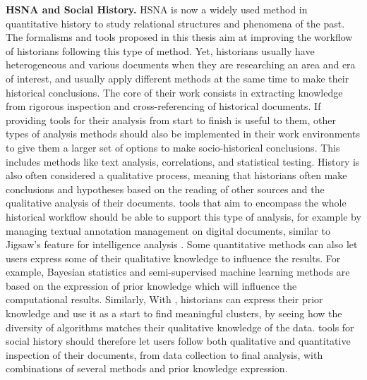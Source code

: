 \noindent\textbf{HSNA and Social History.} HSNA is now a widely used method in quantitative history to study relational structures and phenomena of the past\cite{kerschbaumerPowerNetworksProspects2015, petzCombiningNetworkResearch2022, wetherellHistoricalSocialNetwork1998}. The formalisms and tools proposed in this thesis aim at improving the workflow of historians following this type of method.
Yet, historians usually have heterogeneous and various documents when they are researching an area and era of interest, and usually apply different methods at the same time to make their historical conclusions\cite{padgettRobustActionRise1993, petzCombiningNetworkResearch2022}.
The core of their work consists in extracting knowledge from rigorous inspection and cross-referencing of historical documents.
If providing \va tools for their \hsna analysis from start to finish is useful to them, other types of analysis methods should also be implemented in their work environments to give them a larger set of options to make socio-historical conclusions.
This includes methods like text analysis, correlations, and statistical testing\cite{lemercierQuantitativeMethodsHumanities2019}.
History is also often considered a qualitative process, meaning that historians often make conclusions and hypotheses based on the reading of other sources and the qualitative analysis of their documents.
\va tools that aim to encompass the whole historical workflow should be able to support this type of analysis, for example by managing textual annotation management on digital documents, similar to Jigsaw's feature for intelligence analysis \cite{staskoJigsawSupportingInvestigative2008}.
Some quantitative methods can also let users express some of their qualitative knowledge to influence the results.
For example, Bayesian statistics and semi-supervised machine learning methods are based on the expression of prior knowledge which will influence the computational results.
Similarly, With \pkclustering, historians can express their prior knowledge and use it as a start to find meaningful clusters, by seeing how the diversity of algorithms matches their qualitative knowledge of the data.
\va tools for social history should therefore let users follow both qualitative and quantitative inspection of their documents, from data collection to final analysis, with combinations of several methods and prior knowledge expression.


